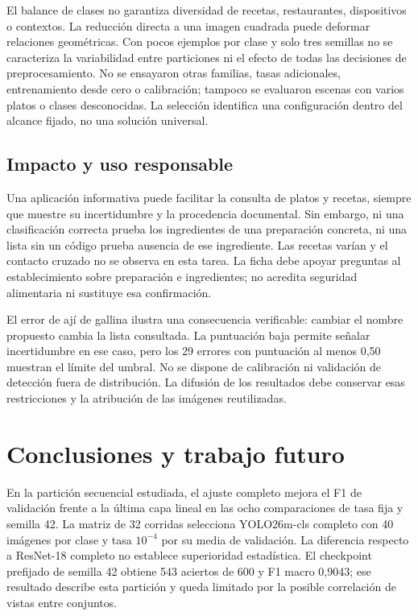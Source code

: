 \documentclass[conference]{IEEEtran}
\begin{document}
El balance de clases no garantiza diversidad de recetas, restaurantes, dispositivos o contextos. La reducción directa a una imagen cuadrada puede deformar relaciones geométricas. Con pocos ejemplos por clase y solo tres semillas no se caracteriza la variabilidad entre particiones ni el efecto de todas las decisiones de preprocesamiento. No se ensayaron otras familias, tasas adicionales, entrenamiento desde cero o calibración; tampoco se evaluaron escenas con varios platos o clases desconocidas. La selección identifica una configuración dentro del alcance fijado, no una solución universal.

\subsection{Impacto y uso responsable}
Una aplicación informativa puede facilitar la consulta de platos y recetas, siempre que muestre su incertidumbre y la procedencia documental. Sin embargo, ni una clasificación correcta prueba los ingredientes de una preparación concreta, ni una lista sin un código prueba ausencia de ese ingrediente. Las recetas varían y el contacto cruzado no se observa en esta tarea. La ficha debe apoyar preguntas al establecimiento sobre preparación e ingredientes; no acredita seguridad alimentaria ni sustituye esa confirmación.

El error de ají de gallina ilustra una consecuencia verificable: cambiar el nombre propuesto cambia la lista consultada. La puntuación baja permite señalar incertidumbre en ese caso, pero los 29 errores con puntuación al menos 0,50 muestran el límite del umbral. No se dispone de calibración ni validación de detección fuera de distribución. La difusión de los resultados debe conservar esas restricciones y la atribución de las imágenes reutilizadas.

\section{Conclusiones y trabajo futuro}
En la partición secuencial estudiada, el ajuste completo mejora el F1 de validación frente a la última capa lineal en las ocho comparaciones de tasa fija y semilla 42. La matriz de 32 corridas selecciona YOLO26m-cls completo con 40 imágenes por clase y tasa $10^{-4}$ por su media de validación. La diferencia respecto a ResNet-18 completo no establece superioridad estadística. El checkpoint prefijado de semilla 42 obtiene 543 aciertos de 600 y F1 macro 0,9043; ese resultado describe esta partición y queda limitado por la posible correlación de vistas entre conjuntos.
\end{document}

